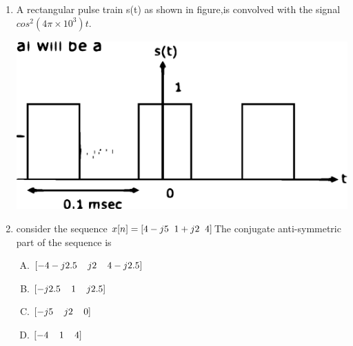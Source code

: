 \documentclass[journal,12pt,twocolumn]{IEEEtran}
\begin{document}
\begin{enumerate}
\begin{enumerate}[(A)]
\end{enumerate}

\item A rectangular pulse train s(t) as shown in figure,is convolved with the signal $cos^{2}(4\pi \times 10^{3})t$.

\includegraphics[scale=0.4]{fig3.eps}

\begin{enumerate}[(A)]
\end{enumerate}

\item consider the sequence $x[n]=[4-j5\hspace{2mm}1+j2 \hspace{2mm}4]$\newline The conjugate anti-symmetric part of the sequence is
\begin{enumerate}[(A)]

\setlength\itemsep{2em}
\item $
[-4-j2.5\hspace{4mm}j2 \hspace{4mm}4-j2.5]
$
\item $
[-j2.5\hspace{4mm}1\hspace{4mm}j2.5]
$
\item $
[-j5\hspace{4mm}j2 \hspace{4mm}0]
$
\item $
[-4\hspace{4mm}1 \hspace{4mm}4]
$


\end{enumerate}
\end{enumerate}
\end{document}
